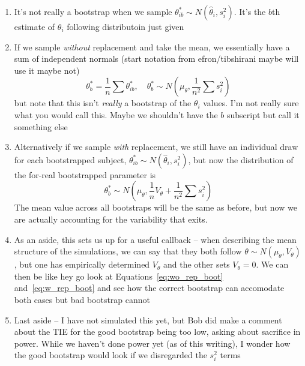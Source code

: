 \documentclass{article}
\begin{document}
\begin{singlespace}
\begin{enumerate}
\vspace{-2mm}
\item It's not really a bootstrap when we sample $\theta^*_{ib} \sim N(\hat{\theta}_i, s_i^2)$. It's the $b$th estimate of $\theta_i$ following distributoin just given
\item If we sample \textit{without} replacement and take the mean, we essentially have a sum of independent normals (start notation from efron/tibshirani maybe will use it maybe not)
\begin{equation}\label{eq:wo_rep_boot}
\theta^{*}_b = \frac1n \sum \theta^{*}_{ib}, \quad \theta^{*}_b  \sim N \left( \mu_{\theta}, \frac{1}{n^2} \sum s_i^2 \right)
\end{equation}
but note that this isn't \textit{really} a bootstrap of the $\theta_i$ values. I'm not really sure what you would call this. Maybe we shouldn't have the $b$ subscript but call it something else
\item Alternatively if we sample \textit{with} replacement, we still have an individual draw for each bootstrapped subject, $\theta^*_{ib} \sim N(\hat{\theta}_i, s_i^2)$, but now the distribution of the for-real bootstrapped parameter is 
\begin{equation}\label{eq:w_rep_boot}
\theta^{*}_b \sim N \left( \mu_{\theta}, \frac1n V_{\theta} + \frac{1}{n^2} \sum s_i^2 \right)
\end{equation}
The mean value across all bootstraps will be the same as before, but now we are actually accounting for the variability that exits.
\item As an aside, this sets us up for a useful callback -- when describing the mean structure of the simulations, we can say that they both follow $\theta \sim N(\mu_{\theta}, V_{\theta})$, but one has empirically determined $V_{\theta}$ and the other sets $V_{\theta} = 0$. We can then be like hey go look at Equations~\ref{eq:wo_rep_boot} and~\ref{eq:w_rep_boot} and see how the correct bootstrap can accomodate both cases but bad bootstrap cannot
\item Last aside -- I have not simulated this yet, but Bob did make a comment about the TIE for the good bootstrap being too low, asking about sacrifice in power. While we haven't done power yet (as of this writing), I wonder how the good bootstrap would look if we disregarded the $s_i^2$ terms
\end{enumerate}
\end{singlespace}
\end{document}
